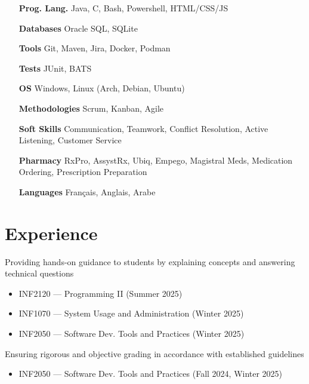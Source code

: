\documentclass[letterpaper,10pt]{article}
\begin{document}
  \begin{multicols}{2}
    \begin{itemize}[itemsep=-2px, parsep=5pt, leftmargin=75pt]
      \item[\textbf{Prog. Lang.}] Java, C, Bash, Powershell, HTML/CSS/JS
      \item[\textbf{Databases}] Oracle SQL, SQLite
      \item[\textbf{Tools}] Git, Maven, Jira, Docker, Podman      
      \item[\textbf{Tests}] JUnit, BATS
      \item[\textbf{OS}]  Windows, Linux (Arch, Debian, Ubuntu)
      \item[\textbf{Methodologies}]  Scrum, Kanban, Agile
      \item[\textbf{Soft Skills}]  Communication, Teamwork, Conflict Resolution, Active Listening, Customer Service
      \item[\textbf{Pharmacy}]  RxPro, AssystRx, Ubiq, Empego, Magistral Meds, Medication Ordering, Prescription Preparation
      \item[\textbf{Languages}]  Français, Anglais, Arabe
    \end{itemize}
  \end{multicols}


  \section{Experience}

  \begin{resume_list}
    \item Providing hands-on guidance to students by explaining concepts and answering technical questions
    \begin{itemize}
        \item INF2120 — Programming II (Summer 2025)
        \item INF1070 — System Usage and Administration (Winter 2025)
        \item INF2050 — Software Dev. Tools and Practices (Winter 2025)
    \end{itemize}
  \vspace{3pt}
  
    \item Ensuring rigorous and objective grading in accordance with established guidelines
    \begin{itemize}
        \item INF2050 — Software Dev. Tools and Practices (Fall 2024, Winter 2025)
    \end{itemize}
  \end{resume_list}
\end{document}
